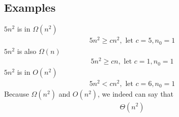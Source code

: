 \documentclass[a4paper]{article}
\theoremstyle{plain}
\theoremstyle{definition}
\newtheorem{exmp}{Example}[section]
\theoremstyle{remark}
\begin{document}
\subsection{Examples}
\begin{tcolorbox}[colback=black!3!white,colframe=black!60!white,title=\begin{exmp}Example 1 \label{Example 1}\end{exmp}]
        $5n^2$ is in $\Omega(n^2)$
                \begin{align}
                5n^2\ge cn^2, \text{ let } c=5, n_0=1
                \end{align}
	$5n^2$ is also $\Omega(n)$
	\begin{align}
		5n^2\ge cn, \text{ let }c=1, n_0=1
	\end{align}
	$5n^2$ is in $O(n^2)$
	\begin{align}
		5n^2 < cn^2, \text{ let } c=6, n_0=1
	\end{align}
	Because $\Omega(n^2)$ and $O(n^2)$, we indeed can say that
	\begin{align}
		\Theta(n^2)
	\end{align} 
\end{tcolorbox}
\end{document}
